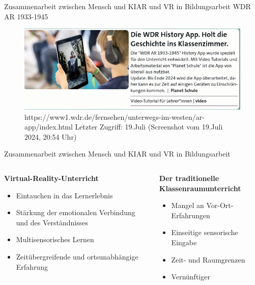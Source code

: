 \documentclass[169,9pt]{beamer}
\begin{document}
\begin{frame}{Zusammenarbeit zwischen Mensch und KI}{AR und VR in Bildungsarbeit}
WDR AR 1933-1945
\begin{figure}[h]
    \centering
    \includegraphics[width=1.0\textwidth]{Bildschirmfoto vom 2024-07-19 20-54-04.png}
    \caption{\smaller \smaller https://www1.wdr.de/fernsehen/unterwegs-im-westen/ar-app/index.html \newline Letzter Zugriff: 19.Juli (Screenshot vom 19.Juli 2024, 20:54 Uhr)}
    \label{fig:my_label}
\end{figure}
\end{frame}

\begin{frame}{Zusammenarbeit zwischen Mensch und KI}{AR und VR in Bildungsarbeit}
\begin{columns}
                \begin{column}{0.45\textwidth}
                    \textbf{Virtual-Reality-Unterricht}
                        \begin{itemize}
                            \item Eintauchen in das Lernerlebnis
                            \item Stärkung der emotionalen Verbindung und des Verständnisses
                            \item Multisensorisches Lernen
                            \item Zeitübergreifende und ortsunabhängige Erfahrung
                        \end{itemize}
                \end{column}
                \begin{column}{0.45\textwidth}
                    \textbf{Der traditionelle Klassenraumunterricht}
                        \begin{itemize}
                            \item Mangel an Vor-Ort-Erfahrungen
                            \item Einseitige sensorische Eingabe
                            \item Zeit- und Raumgrenzen
                            \item Vernünftiger
                        \end{itemize}
                \end{column}
            \end{columns}
\end{frame}
\end{document}
